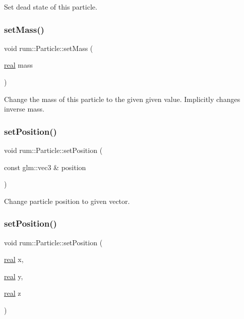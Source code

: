 Set dead state of this particle. \mbox{\label{classrum_1_1_particle_adc0d0457bf81cc25fd4dbaf6cf8546b1}} 
\subsubsection{\texorpdfstring{set\+Mass()}{setMass()}}
{\footnotesize\ttfamily void rum\+::\+Particle\+::set\+Mass (\begin{DoxyParamCaption}\item[{\mbox{\hyperlink{namespacerum_a7e8cca23573d5eaead0f138cbaa4862c}{real}}}]{mass }\end{DoxyParamCaption})}

Change the mass of this particle to the given given value. Implicitly changes inverse mass. \mbox{\label{classrum_1_1_particle_a378c98f478f2112c3fb6630b07b4aee5}} 
\subsubsection{\texorpdfstring{set\+Position()}{setPosition()}\hspace{0.1cm}{\footnotesize\ttfamily [1/2]}}
{\footnotesize\ttfamily void rum\+::\+Particle\+::set\+Position (\begin{DoxyParamCaption}\item[{const glm\+::vec3 \&}]{position }\end{DoxyParamCaption})}

Change particle position to given vector. \mbox{\label{classrum_1_1_particle_a1e3845cefe5fa7464150809b06161ca2}} 
\subsubsection{\texorpdfstring{set\+Position()}{setPosition()}\hspace{0.1cm}{\footnotesize\ttfamily [2/2]}}
{\footnotesize\ttfamily void rum\+::\+Particle\+::set\+Position (\begin{DoxyParamCaption}\item[{\mbox{\hyperlink{namespacerum_a7e8cca23573d5eaead0f138cbaa4862c}{real}}}]{x,  }\item[{\mbox{\hyperlink{namespacerum_a7e8cca23573d5eaead0f138cbaa4862c}{real}}}]{y,  }\item[{\mbox{\hyperlink{namespacerum_a7e8cca23573d5eaead0f138cbaa4862c}{real}}}]{z }\end{DoxyParamCaption})}

